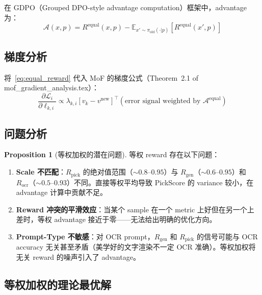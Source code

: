 \documentclass[11pt,a4paper]{article}
\newcommand{\loss}{\mathcal{L}}
\newcommand{\E}{\mathbb{E}}
\newcommand{\adv}{\mathcal{A}}
\newcommand{\reward}{R}
\theoremstyle{definition}
\newtheorem{proposition}{Proposition}
\begin{document}
在 GDPO（Grouped DPO-style advantage computation）框架中，advantage 为：
\begin{equation}
\adv(x, p) = \reward^{\mathrm{equal}}(x, p) - \E_{x' \sim \pi_{\mathrm{old}}(\cdot|p)}\left[\reward^{\mathrm{equal}}(x', p)\right]
\end{equation}

\subsection{梯度分析}

将~\eqref{eq:equal_reward} 代入 MoF 的梯度公式（Theorem~2.1 of mof\_gradient\_analysis.tex）：
\begin{equation}
\frac{\partial \loss_i}{\partial \ell_{k,i}} \propto \lambda_{k,i}\left[v_k - v^{\mathrm{new}}\right]^\top \left(\text{error signal weighted by } \adv^{\mathrm{equal}}\right)
\end{equation}

\subsection{问题分析}

\begin{proposition}[等权加权的潜在问题]
\label{prop:equal_weight_issues}
等权 reward 存在以下问题：

\begin{enumerate}[leftmargin=1.5em]
\item \textbf{Scale 不匹配}：$R_{\mathrm{pick}}$ 的绝对值范围（$\sim 0.8$--$0.95$）与 $R_{\mathrm{gen}}$（$\sim 0.6$--$0.95$）和 $R_{\mathrm{ocr}}$（$\sim 0.5$--$0.93$）不同。直接等权平均导致 PickScore 的 variance 较小，在 advantage 计算中贡献不足。

\item \textbf{Reward 冲突的平滑效应}：当某个 sample 在一个 metric 上好但在另一个上差时，等权 advantage 接近于零——无法给出明确的优化方向。

\item \textbf{Prompt-Type 不敏感}：对 OCR prompt，$R_{\mathrm{gen}}$ 和 $R_{\mathrm{pick}}$ 的信号可能与 OCR accuracy 无关甚至矛盾（美学好的文字渲染不一定 OCR 准确）。等权加权将无关 reward 的噪声引入了 advantage。
\end{enumerate}
\end{proposition}

\subsection{等权加权的理论最优解}
\end{document}
